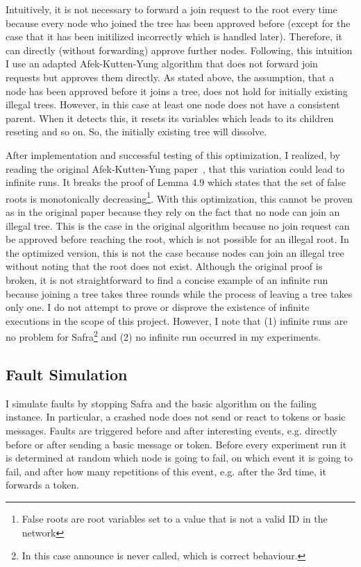 Intuitively, it is not necessary to forward a join request to the root every time because every node who joined the tree has been approved before (except for the case that it has been initilized incorrectly which is handled later).
Therefore, it can directly (without forwarding) approve further nodes.
Following, this intuition I use an adapted Afek-Kutten-Yung algorithm that does not forward join requests but approves them directly.
As stated above, the assumption, that a node has been approved before it joins a tree, does not hold for initially existing illegal trees.
However, in this case at least one node does not have a consistent parent.
When it detects this, it resets its variables which leads to its children reseting and so on.
So, the initially existing tree will dissolve.

After implementation and successful testing of this optimization, I realized, by reading the original Afek-Kutten-Yung paper~\cite{afek}, that this variation could lead to infinite runs.
It breaks the proof of Lemma 4.9 which states that the set of false roots is monotonically decreasing\footnote{False roots are root variables set to a value that is not a valid ID in the network}.
With this optimization, this cannot be proven as in the original paper because they rely on the fact that no node can join an illegal tree.
This is the case in the original algorithm because no join request can be approved before reaching the root, which is not possible for an illegal root.
In the optimized version, this is not the case because nodes can join an illegal tree without noting that the root does not exist.
Although the original proof is broken, it is not straightforward to find a concise example of an infinite run because joining a tree takes three rounds while the process of leaving a tree takes only one.
I do not attempt to prove or disprove the existence of infinite executions in the scope of this project.
However, I note that (1) infinite runs are no problem for Safra\footnote{In this case announce is never called, which is correct behaviour.} and (2) no infinite run occurred in my experiments.

\subsection{Fault Simulation}
I simulate faults by stopping Safra and the basic algorithm on the failing instance.
In particular, a crashed node does not send or react to tokens or basic messages.
Faults are triggered before and after interesting events, e.g. directly before or after sending a basic message or token.
Before every experiment run it is determined at random which node is going to fail, on which event it is going to fail, and after how many repetitions of this event, e.g. after the 3rd time, it forwards a token.


